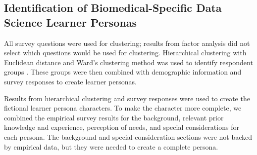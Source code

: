 \documentclass[020-persona\_validation.tex]{subfiles}
\begin{document}
    \subsection{Identification of Biomedical-Specific Data Science Learner Personas}

        All survey questions were used for clustering;
        results from factor analysis did not select which questions would be used for clustering.
        Hierarchical clustering with Euclidean distance and
        Ward's clustering method was used to identify respondent groups
        \cite{rcoreteamLanguageEnvironmentStatistical2021}.
        These groups were then combined with demographic information and survey responses to create learner personas.

        Results from hierarchical clustering and survey responses were used to create the
        fictional learner persona characters.
        To make the character more complete,
        we combined the empirical survey results for the
        background,
        relevant prior knowledge and experience,
        perception of needs,
        and special considerations
        for each persona.
        The background and special consideration sections were not backed by empirical data,
        but they were needed to create a complete persona.
\end{document}

